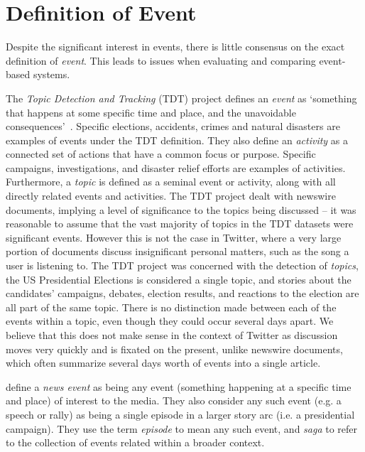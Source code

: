
\section{Definition of Event}
\label{DefiningEvent}
Despite the significant interest in events, there is little consensus on the exact definition of \textit{event}.
This leads to issues when evaluating and comparing event-based systems.

The \emph{Topic Detection and Tracking} (TDT) project defines an \emph{event} as `something that happens at some specific time and place, and the unavoidable consequences'~\citep{Allan:2002:ITD:772260.772262}.
Specific elections, accidents, crimes and natural disasters are examples of events under the TDT definition.
They also define an \emph{activity} as a connected set of actions that have a common focus or purpose.
Specific campaigns, investigations, and disaster relief efforts are examples of activities.
Furthermore, a \emph{topic} is defined as a seminal event or activity, along with all directly related events and activities.
The TDT project dealt with newswire documents, implying a level of significance to the topics being discussed -- it was reasonable to assume that the vast majority of topics in the TDT datasets were significant events.
However this is not the case in Twitter, where a very large portion of documents discuss insignificant personal matters, such as the song a user is listening to.
The TDT project was concerned with the detection of \emph{topics}, the US Presidential Elections is considered a single topic, and stories about the candidates' campaigns, debates, election results, and reactions to the election are all part of the same topic.
There is no distinction made between each of the events within a topic, even though they could occur several days apart.
We believe that this does not make sense in the context of Twitter as discussion moves very quickly and is fixated on the present, unlike newswire documents, which often summarize several days worth of events into a single article.

\cite{aggarwalevent} define a \emph{news event} as being any event (something happening at a specific time and place) of interest to the media.
They also consider any such event (e.g. a speech or rally) as being a single episode in a larger story arc (i.e. a presidential campaign).
They use the term \emph{episode} to mean any such event, and \emph{saga} to refer to the collection of events related within a broader context.

